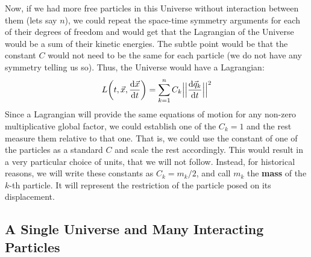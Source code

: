 \documentclass[11pt, a4paper]{article} %
\begin{document}
Now, if we had more free particles in this Universe without interaction between them (lets say $n$), we could repeat the space-time symmetry arguments for each of their degrees of freedom and would get that the Lagrangian of the Universe would be a sum of their kinetic energies. The subtle point would be that the constant $C$ would not need to be the same for each particle (we do not have any symmetry telling us so). Thus, the Universe would have a Lagrangian:
\begin{equation}
L\qty(t, \vec{x}, \dv{\vec{x}}{t})=\sum_{k=1}^n C_k\Big|\Big|\dv{\vec{q}_k}{t}\Big|\Big|^2
\end{equation}
Since a Lagrangian will provide the same equations of motion for any non-zero multiplicative global factor, we could establish one of the $C_k=1$ and the rest measure them relative to that one. That is, we could use the constant of one of the particles as a standard $C$ and scale the rest accordingly. This would result in a very particular choice of units, that we will not follow. Instead, for historical reasons, we will write these constants as $C_k=m_k/2$, and call $m_k$ the {\bf mass} of the $k$-th particle. It will represent the restriction of the particle posed on its displacement.

\subsection*{A Single Universe and Many Interacting Particles}
\end{document}
